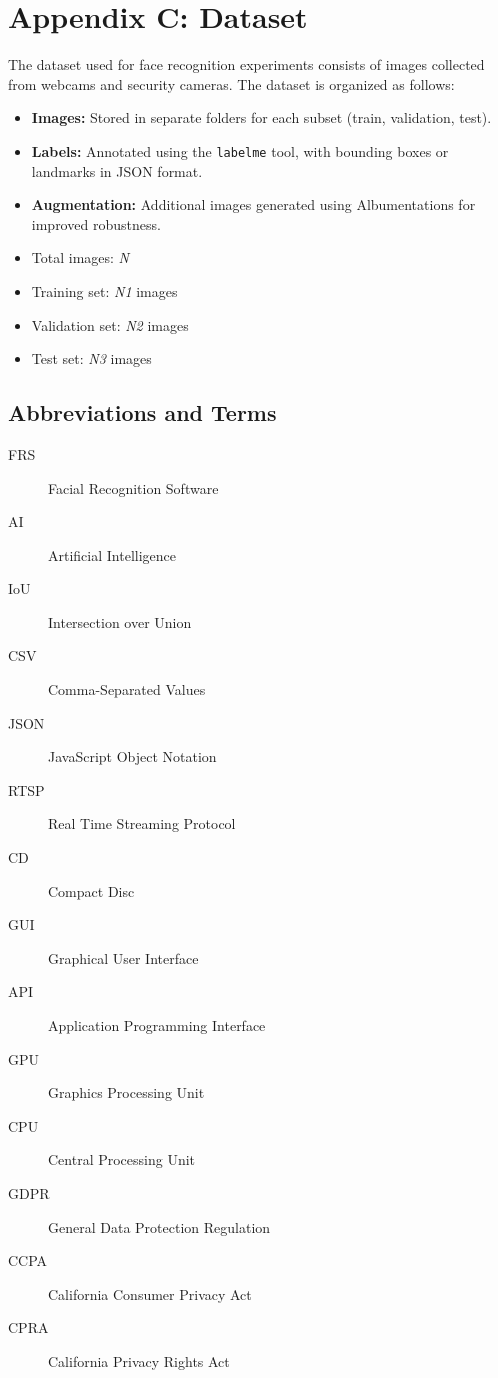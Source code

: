 \section*{Appendix C: Dataset}

The dataset used for face recognition experiments consists of images collected from webcams and security cameras. The dataset is organized as follows:
\begin{itemize}
    \item \textbf{Images:} Stored in separate folders for each subset (train, validation, test).
    \item \textbf{Labels:} Annotated using the \texttt{labelme} tool, with bounding boxes or landmarks in JSON format.
    \item \textbf{Augmentation:} Additional images generated using Albumentations for improved robustness.
\end{itemize}

\begin{itemize}
    \item Total images: \textit{N}
    \item Training set: \textit{N1} images
    \item Validation set: \textit{N2} images
    \item Test set: \textit{N3} images
\end{itemize}

\subsection*{Abbreviations and Terms}
\begin{description}
    \item[FRS] Facial Recognition Software
    \item[AI] Artificial Intelligence
    \item[IoU] Intersection over Union
    \item[CSV] Comma-Separated Values
    \item[JSON] JavaScript Object Notation
    \item[RTSP] Real Time Streaming Protocol
    \item[CD] Compact Disc
    \item[GUI] Graphical User Interface
    \item[API] Application Programming Interface
    \item[GPU] Graphics Processing Unit
    \item[CPU] Central Processing Unit
    \item[GDPR] General Data Protection Regulation
    \item[CCPA] California Consumer Privacy Act
    \item[CPRA] California Privacy Rights Act
\end{description}

